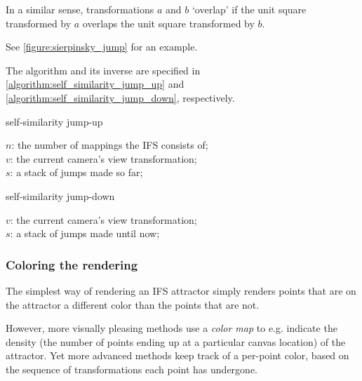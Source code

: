 \documentclass[11pt]{article}
\begin{document}
In a similar sense, transformations \(a\) and \(b\) `overlap' if the unit square transformed by \(a\) overlaps the unit square transformed by \(b\).

See \autoref{figure:sierpinsky_jump} for an example. 

The algorithm and its inverse are specified in \autoref{algorithm:self_similarity_jump_up} and \autoref{algorithm:self_similarity_jump_down}, respectively.

\begin{algorithm}
\caption{self-similarity jump-up}
\label{algorithm:self_similarity_jump_up}
  $n$: the number of mappings the IFS consists of; \\
  $v$: the current camera's view transformation; \\
  $s$: a stack of jumps made so far; \\
\end{algorithm}

\begin{algorithm}
\caption{self-similarity jump-down}
\label{algorithm:self_similarity_jump_down}
  $v$: the current camera's view transformation; \\
  $s$: a stack of jumps made until now; \\
\end{algorithm}

\subsubsection{Coloring the rendering}
\label{sec:orgf67bbda}
\label{subsection:coloring}

The simplest way of rendering an IFS attractor simply renders points that are on the attractor a different color
than the points that are not.

However, more visually pleasing methods use a \emph{color map} to e.g. indicate the density (the number of points ending up at a particular canvas location) of the attractor.
Yet more advanced methods \cite{draves2003fractal} keep track of a per-point color, based on the sequence of transformations each point has undergone.
\end{document}
